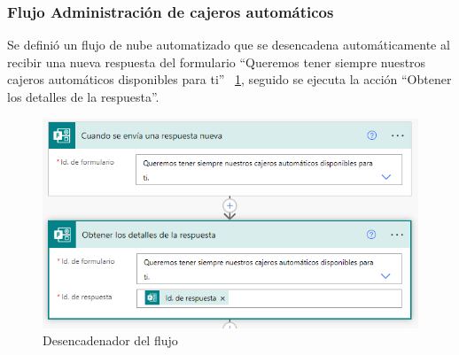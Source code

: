 \subsubsection{Flujo Administración de cajeros automáticos}
Se definió un flujo de nube automatizado que se desencadena automáticamente al recibir una nueva respuesta del formulario ``Queremos tener siempre nuestros cajeros automáticos disponibles para ti'' ~\ref{fig:DesFlu}, seguido se ejecuta la acción ``Obtener los detalles de la respuesta''.
\begin{figure}[H]
	\centering
	\includegraphics[scale=0.5]{Capitulo3/imagenes/flujo1.png}
	\caption{Desencadenador del flujo}
	\label{fig:DesFlu}
\end{figure}

